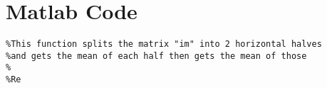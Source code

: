 \appendix
\renewcommand{\appendixtocname}{Appendix}
\renewcommand{\appendixpagename}{\appendixtocname}
\addappheadtotoc
{}
\appendixpage

\chapter{Matlab Code}

\begin{lstlisting}
%This function splits the matrix "im" into 2 horizontal halves
%and gets the mean of each half then gets the mean of those
%
%Re
\end{lstlisting}
\clearpage
